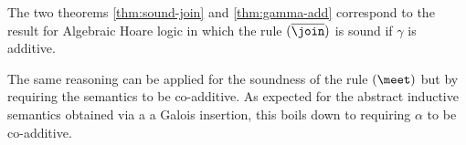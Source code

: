 The two theorems \ref{thm:sound-join} and \ref{thm:gamma-add} correspond to the
result for Algebraic Hoare logic in which the rule $(\overline{\join})$ is sound
if $\gamma$ is additive.

The same reasoning can be applied for the soundness of the rule $(\meet)$ but
by requiring the semantics to be co-additive. As expected for the abstract
inductive semantics obtained via a a Galois insertion, this boils down to 
requiring $\alpha$ to be co-additive.

